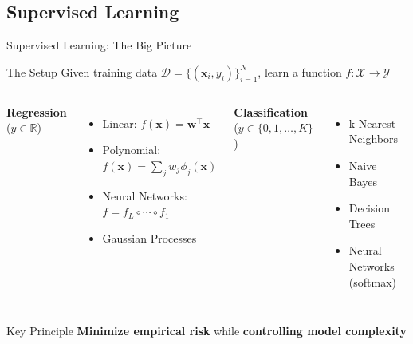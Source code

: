 \documentclass[aspectratio=169,11pt]{beamer}
\newcommand{\x}{\mathbf{x}}
\newcommand{\w}{\mathbf{w}}
\newcommand{\R}{\mathbb{R}}
\begin{document}
\subsection{Supervised Learning}

\begin{frame}{Supervised Learning: The Big Picture}
\begin{block}{The Setup}
Given training data $\mathcal{D} = \{(\x_i, y_i)\}_{i=1}^N$, learn a function $f: \mathcal{X} \to \mathcal{Y}$
\end{block}

\begin{columns}
\textbf{Regression} ($y \in \R$)
\begin{itemize}
    \item Linear: $f(\x) = \w^\top \x$
    \item Polynomial: $f(\x) = \sum_j w_j \phi_j(\x)$
    \item Neural Networks: $f = f_L \circ \cdots \circ f_1$
    \item Gaussian Processes
\end{itemize}

\textbf{Classification} ($y \in \{0,1,\ldots,K\}$)
\begin{itemize}
    \item k-Nearest Neighbors
    \item Naive Bayes
    \item Decision Trees
    \item Neural Networks (softmax)
\end{itemize}
\end{columns}

\vspace{0.5em}
\begin{alertblock}{Key Principle}
\textbf{Minimize empirical risk} while \textbf{controlling model complexity}
\end{alertblock}
\end{frame}
\end{document}
